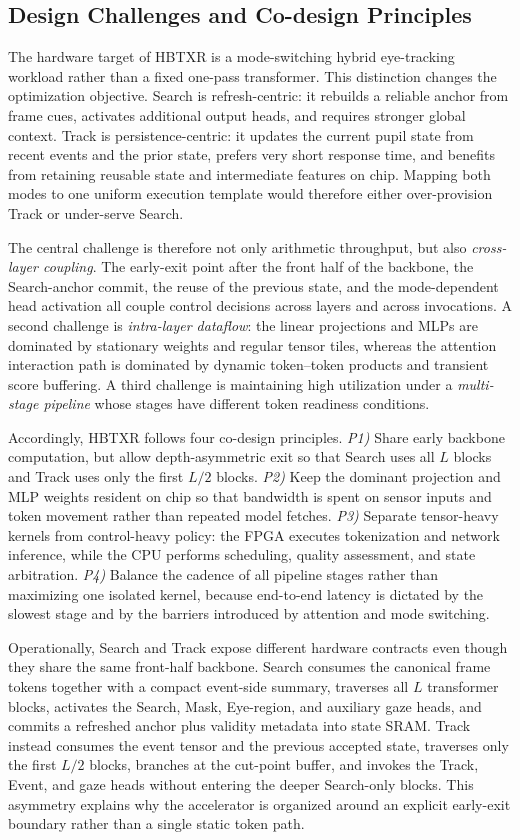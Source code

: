 \documentclass[journal]{IEEEtran}
\begin{document}
\subsection{Design Challenges and Co-design Principles}
The hardware target of HBTXR is a mode-switching hybrid eye-tracking workload rather than a fixed one-pass transformer. This distinction changes the optimization objective. Search is refresh-centric: it rebuilds a reliable anchor from frame cues, activates additional output heads, and requires stronger global context. Track is persistence-centric: it updates the current pupil state from recent events and the prior state, prefers very short response time, and benefits from retaining reusable state and intermediate features on chip. Mapping both modes to one uniform execution template would therefore either over-provision Track or under-serve Search.

The central challenge is therefore not only arithmetic throughput, but also \emph{cross-layer coupling}. The early-exit point after the front half of the backbone, the Search-anchor commit, the reuse of the previous state, and the mode-dependent head activation all couple control decisions across layers and across invocations. A second challenge is \emph{intra-layer dataflow}: the linear projections and MLPs are dominated by stationary weights and regular tensor tiles, whereas the attention interaction path is dominated by dynamic token--token products and transient score buffering. A third challenge is maintaining high utilization under a \emph{multi-stage pipeline} whose stages have different token readiness conditions.

Accordingly, HBTXR follows four co-design principles. \emph{P1)} Share early backbone computation, but allow depth-asymmetric exit so that Search uses all $L$ blocks and Track uses only the first $L/2$ blocks. \emph{P2)} Keep the dominant projection and MLP weights resident on chip so that bandwidth is spent on sensor inputs and token movement rather than repeated model fetches. \emph{P3)} Separate tensor-heavy kernels from control-heavy policy: the FPGA executes tokenization and network inference, while the CPU performs scheduling, quality assessment, and state arbitration. \emph{P4)} Balance the cadence of all pipeline stages rather than maximizing one isolated kernel, because end-to-end latency is dictated by the slowest stage and by the barriers introduced by attention and mode switching.


Operationally, Search and Track expose different hardware contracts even though they share the same front-half backbone. Search consumes the canonical frame tokens together with a compact event-side summary, traverses all $L$ transformer blocks, activates the Search, Mask, Eye-region, and auxiliary gaze heads, and commits a refreshed anchor plus validity metadata into state SRAM. Track instead consumes the event tensor and the previous accepted state, traverses only the first $L/2$ blocks, branches at the cut-point buffer, and invokes the Track, Event, and gaze heads without entering the deeper Search-only blocks. This asymmetry explains why the accelerator is organized around an explicit early-exit boundary rather than a single static token path.
\end{document}
